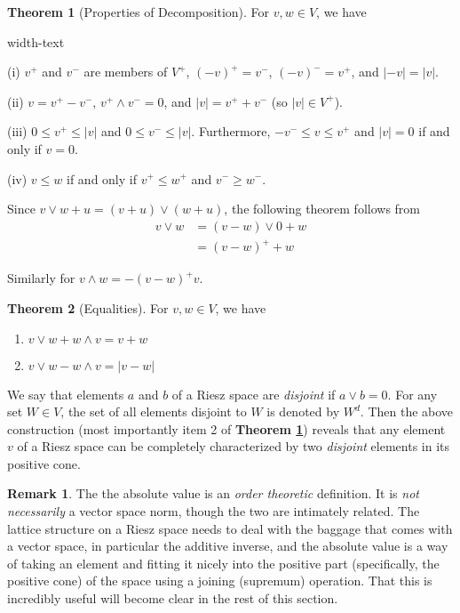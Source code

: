 \documentclass[letterpaper,10pt,oneside,onecolumn,reqno]{amsart}
\theoremstyle{definition}
\newtheorem{thm}{Theorem}
\newtheorem{rem}{Remark}
\newcommand{\meet}{\wedge}
\newcommand{\join}{\vee}
\begin{document}
  \begin{thm}[Properties of Decomposition]
    \label{thr:1}
    For $v,w \in V$, we have
    \begin{deflist}{width-text}
    \item
    \item[(i)] $v^+$ and $v^-$ are members of $V^+$, ${(-v)}^+=v^-$,
      ${(-v)}^-=v^+$, and $|-v|=|v|$.
    \item[(ii)] $v = v^+ - v^-$, $v^+ \meet v^-=0$, and $|v| =
      v^++v^-$ (so $|v| \in V^+$).
    \item[(iii)] $0 \leq v^+ \leq |v|$ and $0 \leq v^- \leq
      |v|$. Furthermore, $-v^- \leq v \leq v^+$ and $|v|=0$ if and
      only if $v=0$.
    \item[(iv)] $v \leq w$ if and only if $v^+ \leq w^+$ and $v^- \geq
      w^-$.
    \end{deflist}
  \end{thm}
  Since $v \join w + u = (v + u) \join (w + u)$, the following theorem
  follows from
  \begin{align*}
    v \join w &= (v-w) \join 0 + w \\
    &= {(v-w)}^+ + w
  \end{align*}

  Similarly for $v \meet w = -{(v-w)}^+ v$.

\begin{thm}[Equalities]\label{thr:2}
  For $v,w \in V$, we have
  \begin{enumerate}
  \item\label{item:1} $v \join w + w \meet v = v + w$
  \item\label{item:2} $v \join w - w \meet v = |v - w|$
  \end{enumerate}
\end{thm}


We say that elements $a$ and $b$ of a Riesz space are
\emph{disjoint} if $a \join b = 0$. For any set $W \in
V$, the set of all elements disjoint to $W$ is denoted by $W^d$. Then
the above construction (most importantly item 2 of \textbf{Theorem
  \ref{thr:1}}) reveals that any element $v$ of a Riesz space can be
completely characterized by two \emph{disjoint} elements in its
positive cone.

\begin{rem}\label{rem:1}
  The the absolute value is an \emph{order theoretic} definition. It
  is \emph{not necessarily} a vector space norm, though the two are
  intimately related. The lattice structure on a Riesz space needs to
  deal with the baggage that comes with a vector space, in particular
  the additive inverse, and the absolute value is a way of taking an
  element and fitting it nicely into the positive part (specifically,
  the positive cone) of the space using a joining (supremum)
  operation. That this is incredibly useful will become clear in the
  rest of this section.
\end{rem}
\end{document}
